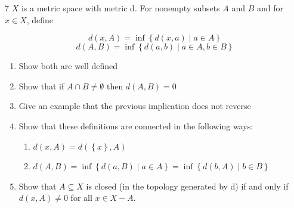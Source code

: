 \documentclass{article}
\newcommand*{\subeq}{\subseteq}
\newcommand*{\empset}{\emptyset}
\begin{document}
\bigskip

\begin{claim}{7}\label{Claim 7.}
    $X$ is a metric space with metric d. For nonempty subsets $A$ and $B$ and for $x \in X$, define 
    
    \[d(x, A) = \inf\left\{ d(x, a) \mid a \in A \right\}\]
    \[d(A, B) = \inf\left\{ d(a, b) \mid a \in A, b \in B \right\}\]

    \begin{enumerate}
        \item Show both are well defined
        \item Show that if $A \cap B \neq \empset$ then $d(A, B) = 0$
        \item Give an example that the previous implication does not reverse
        \item Show that these definitions are connected in the following ways:
        \begin{enumerate}
            \item $d(x, A) = d(\left\{ x \right\}, A)$
            \item $d(A, B) = \inf\left\{ d(a, B) \mid a \in A \right\} = \inf\left\{ d(b, A) \mid b \in B \right\}$  
        \end{enumerate}
        
        \item Show that $A \subeq X$ is closed (in the topology generated by d) if and only if $d(x, A) \neq 0$ for all $x \in X - A$.
    \end{enumerate}
\end{claim}
\end{document}
